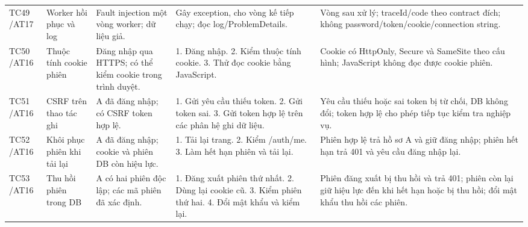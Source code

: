 \begin{smalltable}
\begin{longtable}{L{1.2cm}L{2.5cm}L{3.6cm}L{3.6cm}L{3.7cm}}
TC49 /\allowbreak  AT17 & Worker hồi phục và log & Fault injection một vòng worker; dữ liệu giả. & Gây exception,  cho vòng kế tiếp chạy; đọc log/\allowbreak ProblemDetails. & Vòng sau xử lý; traceId/\allowbreak code theo contract đích; không password/\allowbreak token/\allowbreak cookie/\allowbreak connection string.\\
TC50 /\allowbreak AT16 & Thuộc tính cookie phiên & Đăng nhập qua HTTPS; có thể kiểm cookie trong trình duyệt. & 1. Đăng nhập. 2. Kiểm thuộc tính cookie. 3. Thử đọc cookie bằng JavaScript. & Cookie có HttpOnly, Secure và SameSite theo cấu hình; JavaScript không đọc được cookie phiên.\\
TC51 /\allowbreak AT16 & CSRF trên thao tác ghi & A đã đăng nhập; có CSRF token hợp lệ. & 1. Gửi yêu cầu thiếu token. 2. Gửi token sai. 3. Gửi token hợp lệ trên các phân hệ ghi dữ liệu. & Yêu cầu thiếu hoặc sai token bị từ chối, DB không đổi; token hợp lệ cho phép tiếp tục kiểm tra nghiệp vụ.\\
TC52 /\allowbreak AT16 & Khôi phục phiên khi tải lại & A đã đăng nhập; cookie và phiên DB còn hiệu lực. & 1. Tải lại trang. 2. Kiểm /auth/me. 3. Làm hết hạn phiên và tải lại. & Phiên hợp lệ trả hồ sơ A và giữ đăng nhập; phiên hết hạn trả 401 và yêu cầu đăng nhập lại.\\
TC53 /\allowbreak AT16 & Thu hồi phiên trong DB & A có hai phiên độc lập; các mã phiên đã xác định. & 1. Đăng xuất phiên thứ nhất. 2. Dùng lại cookie cũ. 3. Kiểm phiên thứ hai. 4. Đổi mật khẩu và kiểm lại. & Phiên đăng xuất bị thu hồi và trả 401; phiên còn lại giữ hiệu lực đến khi hết hạn hoặc bị thu hồi; đổi mật khẩu thu hồi các phiên.\\
\bottomrule\end{longtable}\end{smalltable}
